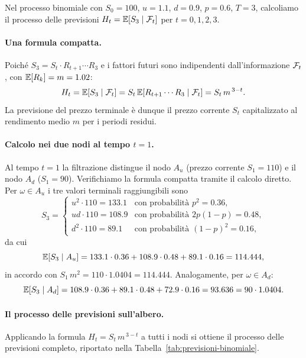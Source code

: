 \begin{example}
\label{es:filtrazione-binomiale}
Nel processo binomiale con $S_0=100$, $u=1.1$, $d=0.9$, $p=0.6$,
$T=3$, calcoliamo il processo delle previsioni
$H_t=\mathbb{E}[S_3\mid\mathcal{F}_t]$ per $t=0,1,2,3$.

\paragraph{Una formula compatta.}
Poich\'{e} $S_3=S_t\cdot R_{t+1}\cdots R_3$ e i fattori futuri sono
indipendenti dall'informazione $\mathcal{F}_t$, con $\mathbb{E}[R_k]=m=1.02$:
\[
H_t=\mathbb{E}[S_3\mid\mathcal{F}_t]
=S_t\,\mathbb{E}[R_{t+1}\cdots R_3\mid\mathcal{F}_t]
=S_t\,m^{\,3-t}.
\]
La previsione del prezzo terminale \`{e} dunque il prezzo corrente
$S_t$ capitalizzato al rendimento medio $m$ per i periodi residui.

\paragraph{Calcolo nei due nodi al tempo $t=1$.}
Al tempo $t=1$ la filtrazione distingue il nodo $A_u$ (prezzo corrente
$S_1=110$) e il nodo $A_d$ ($S_1=90$). Verifichiamo la formula
compatta tramite il calcolo diretto. Per $\omega\in A_u$ i tre valori
terminali raggiungibili sono
\[
S_3=\begin{cases}
u^2\cdot 110=133.1 & \text{con probabilit\`{a} }p^2=0.36,\\
ud\cdot 110=108.9 & \text{con probabilit\`{a} }2p(1-p)=0.48,\\
d^2\cdot 110=89.1 & \text{con probabilit\`{a} }(1-p)^2=0.16,
\end{cases}
\]
da cui
\[
\mathbb{E}[S_3\mid A_u]=133.1\cdot 0.36+108.9\cdot 0.48+89.1\cdot 0.16
=114.444,
\]
in accordo con $S_1\,m^2=110\cdot 1.0404=114.444$. Analogamente, per
$\omega\in A_d$:
\[
\mathbb{E}[S_3\mid A_d]=108.9\cdot 0.36+89.1\cdot 0.48+72.9\cdot 0.16
=93.636=90\cdot 1.0404.
\]

\paragraph{Il processo delle previsioni sull'albero.}
Applicando la formula $H_t=S_t\,m^{\,3-t}$ a tutti i nodi si ottiene
il processo delle previsioni completo, riportato nella
Tabella~\ref{tab:previsioni-binomiale}.


\end{example}
